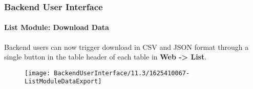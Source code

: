 %

\begin{frame}[fragile]
	\frametitle{Backend User Interface}
	\framesubtitle{List Module: Download Data}

	Backend users can now trigger download in CSV and JSON format through a
	single button in the table header of each table in \textbf{Web -> List}.

	\begin{figure}
		\texttt{[image: BackendUserInterface/11.3/1625410067-ListModuleDataExport]}
	\end{figure}

\end{frame}

